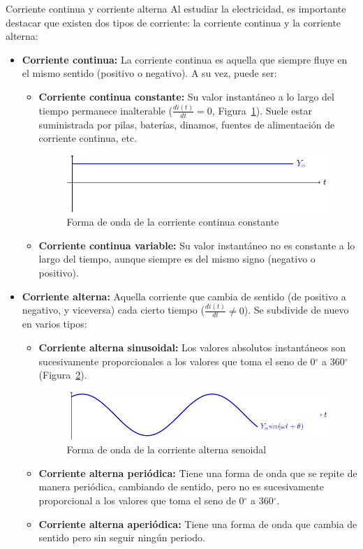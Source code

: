 \documentclass[11pt]{book} %
\makeatletter
\numberwithin{dummy}{section}
\theoremstyle{ocrenumbox}
\theoremstyle{blacknumex}
\theoremstyle{blacknumbox}
\theoremstyle{ocrenum}
\renewcommand{\subsubsection}{\@startsection {subsubsection}{3}{\z@}
{-2ex \@plus -0.1ex \@minus -.2ex}
{.2ex \@plus.2ex }
{\normalfont\small\sffamily\bfseries}}
\makeatother
\begin{document}
	\subsubsection{Corriente continua y corriente alterna} \label{sec.cc-ca}
	Al estudiar la electricidad, es importante destacar que existen dos tipos de corriente: la corriente continua y la corriente alterna:
	\begin{itemize}
		\item \textbf{Corriente continua:} La corriente continua es aquella que siempre fluye en el mismo sentido (positivo o negativo). A su vez, puede ser:
		\begin{itemize}
			\item \textbf{Corriente continua constante:} Su valor instantáneo a lo largo del tiempo permanece inalterable ($\frac{di(t)}{dt} = 0$, Figura~\ref{fig.continua}). Suele estar suministrada por pilas, baterías, dinamos, fuentes de alimentación de corriente continua, etc. 
			\begin{figure}[htbp]
				\centering
				\includegraphics[width=0.75\linewidth]{../figs/continua.pdf}
				\caption{Forma de onda de la corriente continua constante}
				\label{fig.continua}
			\end{figure}
			\item \textbf{Corriente continua variable:} Su valor instantáneo no es constante a lo largo del tiempo, aunque siempre es del mismo signo (negativo o positivo). 
		\end{itemize}
		\item \textbf{Corriente alterna:} Aquella corriente que cambia de sentido (de positivo a negativo, y viceversa) cada cierto tiempo ($\frac{di(t)}{dt} \neq 0$). Se subdivide de nuevo en varios tipos:
		\begin{itemize}
			\item \textbf{Corriente alterna sinusoidal:} Los valores absolutos instantáneos son sucesivamente proporcionales a los valores que toma el seno de 0$^\circ$ a 360$^\circ$ (Figura~\ref{fig.sin}).
			\begin{figure}[htbp]
				\centering
				\includegraphics[width=0.75\linewidth]{../figs/sin.pdf}
				\caption{Forma de onda de la corriente alterna senoidal}
				\label{fig.sin}
			\end{figure}
			\item \textbf{Corriente alterna periódica:} Tiene una forma de onda que se repite de manera periódica, cambiando de sentido, pero no es sucesivamente proporcional a los valores que toma el seno de 0$^\circ$ a 360$^\circ$.
			\item \textbf{Corriente alterna aperiódica:} Tiene una forma de onda que cambia de sentido pero sin seguir ningún periodo.
		\end{itemize}
	\end{itemize}
\end{document}
